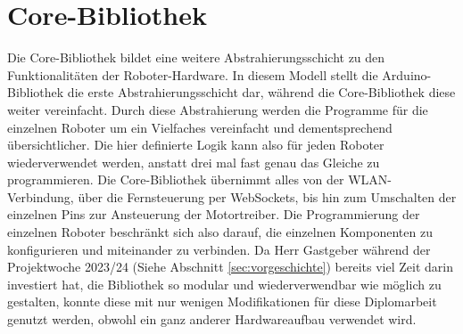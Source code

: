 \section{Core-Bibliothek}
\label{subec:robots_core}
Die Core-Bibliothek bildet eine weitere Abstrahierungsschicht zu den Funktionalitäten der Roboter-Hardware.
%
In diesem Modell stellt die Arduino-Bibliothek die erste Abstrahierungsschicht dar,
während die Core-Bibliothek diese weiter vereinfacht.
%
Durch diese Abstrahierung werden die Programme für die einzelnen Roboter um ein Vielfaches vereinfacht und dementsprechend übersichtlicher.
%
Die hier definierte Logik kann also für jeden Roboter wiederverwendet werden,
anstatt drei mal fast genau das Gleiche zu programmieren.
%
Die Core-Bibliothek übernimmt alles von der WLAN-Verbindung,
über die Fernsteuerung per WebSockets,
bis hin zum Umschalten der einzelnen Pins zur Ansteuerung der Motortreiber.
%
Die Programmierung der einzelnen Roboter beschränkt sich also darauf,
die einzelnen Komponenten zu konfigurieren und miteinander zu verbinden.
%
Da Herr Gastgeber während der Projektwoche 2023/24 (Siehe Abschnitt \ref{sec:vorgeschichte}) bereits viel Zeit darin investiert hat,
die Bibliothek so modular und wiederverwendbar wie möglich zu gestalten,
konnte diese mit nur wenigen Modifikationen für diese Diplomarbeit genutzt werden,
obwohl ein ganz anderer Hardwareaufbau verwendet wird.

